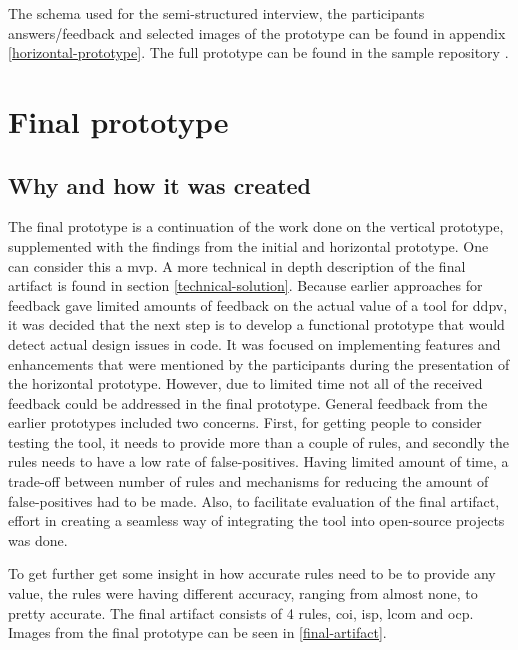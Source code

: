 \documentclass{report}
\begin{document}
The schema used for the semi-structured interview, the participants answers/feedback and selected images of the prototype can be found in appendix \ref{horizontal-prototype}. The full prototype can be found in the sample repository \cite{sample-repository}. 



\section{Final prototype}

\subsection*{Why and how it was created}
The final prototype is a continuation of the work done on the vertical prototype, supplemented with the findings from the initial and horizontal prototype. One can consider this a \gls{mvp}. A more technical in depth description of the final artifact is found in section \ref{technical-solution}. Because earlier approaches for feedback gave limited amounts of feedback on the actual value of a tool for \gls{ddpv}, it was decided that the next step is to develop a functional prototype that would detect actual design issues in code. It was focused on implementing features and enhancements that were mentioned by the participants during the presentation of the horizontal prototype. However, due to limited time not all of the received feedback could be addressed in the final prototype. General feedback from the earlier prototypes included two concerns. First, for getting people to consider testing the tool, it needs to provide more than a couple of rules, and secondly the rules needs to have a low rate of false-positives. Having limited amount of time, a trade-off between number of rules and mechanisms for reducing the amount of false-positives had to be made. Also, to facilitate evaluation of the final artifact, effort in creating a seamless way of integrating the tool into open-source projects was done. 

To get further get some insight in how accurate rules need to be to provide any value, the rules were having different accuracy, ranging from almost none, to pretty accurate.  The final artifact consists of 4 rules, \gls{coi}, \gls{isp}, \gls{lcom} and \gls{ocp}. Images from the final prototype can be seen in \ref{final-artifact}.
\end{document}
